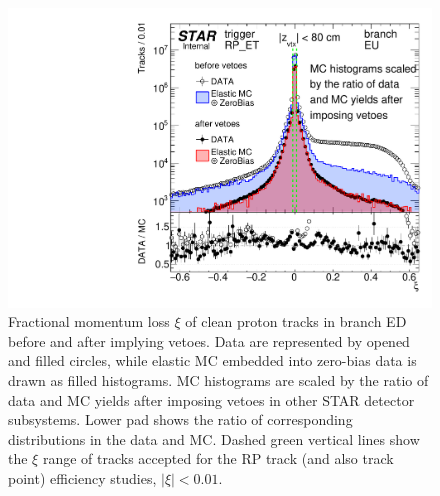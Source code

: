 \begin{figure}\vspace{-154pt} 
	\centering
	\parbox{0.4725\textwidth}{%
		\centering%
		\includegraphics[width=\linewidth,page=2]{graphics/systematicsEfficiency/RpSyst/xiPerBranch.pdf}%
	} 
	\quad
	\parbox{0.4725\textwidth}{ 
		\centering\vspace{67pt}
			\caption[Fractional momentum loss $\xi$ of clean proton tracks before and after implying vetoes in the data and MC (branch ED).]%
			{Fractional momentum loss $\xi$ of clean proton tracks in branch ED before and after implying vetoes. Data are represented by opened and filled circles, while elastic MC embedded into zero-bias data is drawn as filled histograms. MC histograms are scaled by the ratio of data and MC yields after imposing vetoes in other STAR detector subsystems. Lower pad shows the ratio of corresponding distributions in the data and MC. Dashed green vertical lines show the $\xi$ range of tracks accepted for the RP track (and also track point) efficiency studies, $|\xi|<0.01$.}\label{fig:rpSystXi_ED}%
	}
	
\end{figure}


